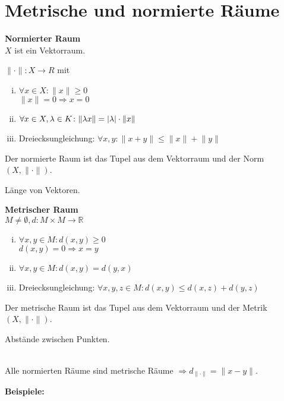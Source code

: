 \documentclass{article}
\begin{document}
\newpage
\section*{Metrische und normierte Räume}

\begin{minipage}[t]{.4\textwidth}
  \textbf{Normierter Raum} \\
  $X$ ist ein Vektorraum.

  $\lVert \cdot \rVert \colon X \to R$ mit
  \begin{enumerate}[(i)]
  \item $\forall x \in X \colon \lVert x \rVert \geq 0$ \\
    $\lVert x \rVert = 0 \Rightarrow x = 0$
  \item $\forall x \in X, \lambda \in K \colon \lVert \lambda x \rVert = \abs{\lambda} \cdot \lVert x \rVert$
  \item Dreiecksungleichung: $\forall x, y \colon \lVert x + y \rVert \leq \lVert x \rVert + \lVert y \rVert$
  \end{enumerate}
  Der normierte Raum ist das Tupel aus dem Vektorraum und der Norm $(X, \lVert \cdot \rVert)$.

  Länge von Vektoren.
\end{minipage} 
\hfill
\vrule
\hfill
\begin{minipage}[t]{.4\textwidth}
  \textbf{Metrischer Raum} \\
  $M \ne \emptyset, d \colon M \times M \to \mathbb{R}$
  \begin{enumerate}[(i)]
  \item $\forall x, y \in M \colon d(x, y) \geq 0$ \\
    $d(x, y) = 0 \Rightarrow x = y$
  \item $\forall x, y \in M \colon d(x, y) = d(y, x)$
  \item Dreiecksungleichung: $\forall x, y, z \in M \colon d(x, y) \leq d(x, z) + d(y, z)$
  \end{enumerate}
  Der metrische Raum ist das Tupel aus dem Vektorraum und der Metrik $(X, \lVert \cdot \rVert)$.

  Abstände zwischen Punkten.
\end{minipage} \\

Alle normierten Räume sind metrische Räume $\Rightarrow d_{\lVert \cdot \rVert} = \lVert x - y \rVert$.

\textbf{Beispiele:}
\end{document}
